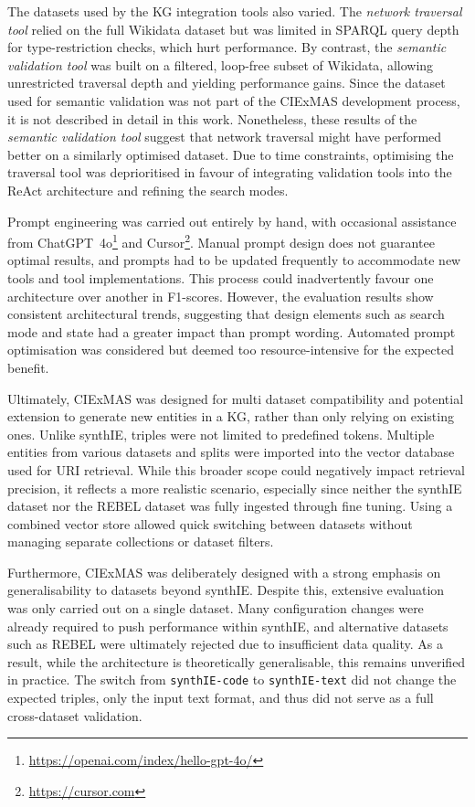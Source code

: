 \documentclass[a4paper,oneside,bibliography=totoc]{scrbook}
\begin{document}
The datasets used by the \ac{KG} integration tools also varied. The \textit{network traversal tool} relied on the full Wikidata dataset but was limited in \ac{SPARQL} query depth for type-restriction checks, which hurt performance. By contrast, the \textit{semantic validation tool} was built on a filtered, loop-free subset of Wikidata, allowing unrestricted traversal depth and yielding performance gains. Since the dataset used for semantic validation was not part of the CIExMAS development process, it is not described in detail in this work. Nonetheless, these results of the \textit{semantic validation tool} suggest that network traversal might have performed better on a similarly optimised dataset. Due to time constraints, optimising the traversal tool was deprioritised in favour of integrating validation tools into the ReAct architecture and refining the search modes.

Prompt engineering was carried out entirely by hand, with occasional assistance from ChatGPT~4o\footnote{\url{https://openai.com/index/hello-gpt-4o/}} and Cursor\footnote{\url{https://cursor.com}}. Manual prompt design does not guarantee optimal results, and prompts had to be updated frequently to accommodate new tools and tool implementations. This process could inadvertently favour one architecture over another in F1-scores. However, the evaluation results show consistent architectural trends, suggesting that design elements such as search mode and state had a greater impact than prompt wording. Automated prompt optimisation was considered but deemed too resource-intensive for the expected benefit.

Ultimately, CIExMAS was designed for multi dataset compatibility and potential extension to generate new entities in a \ac{KG}, rather than only relying on existing ones. Unlike synthIE, triples were not limited to predefined tokens. Multiple entities from various datasets and splits were imported into the vector database used for \ac{URI} retrieval. While this broader scope could negatively impact retrieval precision, it reflects a more realistic scenario, especially since neither the synthIE dataset nor the REBEL dataset was fully ingested through fine tuning. Using a combined vector store allowed quick switching between datasets without managing separate collections or dataset filters.

Furthermore, CIExMAS was deliberately designed with a strong emphasis on generalisability to datasets beyond synthIE. Despite this, extensive evaluation was only carried out on a single dataset. Many configuration changes were already required to push performance within synthIE, and alternative datasets such as REBEL were ultimately rejected due to insufficient data quality. As a result, while the architecture is theoretically generalisable, this remains unverified in practice. The switch from \texttt{synthIE-code} to \texttt{synthIE-text} did not change the expected triples, only the input text format, and thus did not serve as a full cross-dataset validation.
\end{document}
